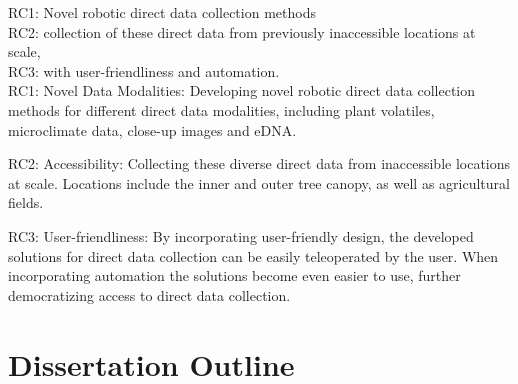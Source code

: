 


RC1: Novel robotic direct data collection methods \\%

RC2: collection of these direct data from previously inaccessible locations at scale, \\%

RC3: with user-friendliness and automation. \\%

RC1: Novel Data Modalities: Developing novel robotic direct data collection methods for different direct data modalities, including plant volatiles, microclimate data, close-up images and eDNA.

RC2: Accessibility: Collecting these diverse direct data from inaccessible locations at scale. Locations include the inner and outer tree canopy, as well as agricultural fields. 

RC3: User-friendliness: By incorporating user-friendly design, the developed solutions for direct data collection can be easily teleoperated by the user. When incorporating automation the solutions become even easier to use, further democratizing access to direct data collection.


\section{Dissertation Outline}

